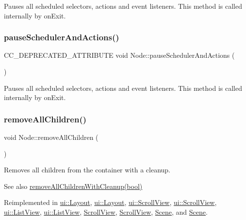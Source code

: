 Pauses all scheduled selectors, actions and event listeners. This method is called internally by on\+Exit. \mbox{\label{classNode_a7ff40b01310820986b26dd335ec19670}} 
\subsubsection{\texorpdfstring{pause\+Scheduler\+And\+Actions()}{pauseSchedulerAndActions()}\hspace{0.1cm}{\footnotesize\ttfamily [2/2]}}
{\footnotesize\ttfamily C\+C\+\_\+\+D\+E\+P\+R\+E\+C\+A\+T\+E\+D\+\_\+\+A\+T\+T\+R\+I\+B\+U\+TE void Node\+::pause\+Scheduler\+And\+Actions (\begin{DoxyParamCaption}{ }\end{DoxyParamCaption})}

Pauses all scheduled selectors, actions and event listeners. This method is called internally by on\+Exit. \mbox{\label{classNode_a0f6ef5518d2e5dd5be405e98b37ace4a}} 
\subsubsection{\texorpdfstring{remove\+All\+Children()}{removeAllChildren()}\hspace{0.1cm}{\footnotesize\ttfamily [1/2]}}
{\footnotesize\ttfamily void Node\+::remove\+All\+Children (\begin{DoxyParamCaption}{ }\end{DoxyParamCaption})\hspace{0.3cm}{\ttfamily [virtual]}}

Removes all children from the container with a cleanup.

\begin{DoxySeeAlso}{See also}
{\ttfamily \hyperlink{classNode_aca66e2b385c3dbf1a6f55627c4a13192}{remove\+All\+Children\+With\+Cleanup(bool)}} 
\end{DoxySeeAlso}


Reimplemented in \hyperlink{classui_1_1Layout_ace8bad280eb1b1df51211cca73131530}{ui\+::\+Layout}, \hyperlink{classui_1_1Layout_a6b40fa4ad7a14a1eece297e466e2c86e}{ui\+::\+Layout}, \hyperlink{classui_1_1ScrollView_aa036ed1712c78c6ee701eb94eea55091}{ui\+::\+Scroll\+View}, \hyperlink{classui_1_1ScrollView_aaef2d3ce7b1b7d485af4a3657bea17e5}{ui\+::\+Scroll\+View}, \hyperlink{classui_1_1ListView_acfa88e95692c1e9713697fbd2754379b}{ui\+::\+List\+View}, \hyperlink{classui_1_1ListView_a7e534825fe60406ed544a254b0975489}{ui\+::\+List\+View}, \hyperlink{classScrollView_a6a3b9ea8f88bca7ad741b511de369f24}{Scroll\+View}, \hyperlink{classScrollView_aaef2d3ce7b1b7d485af4a3657bea17e5}{Scroll\+View}, \hyperlink{classScene_af55bdd0731d6ccfdd1c95c4011451adb}{Scene}, and \hyperlink{classScene_a7e54f25b14b057ab896b0ef3262cef86}{Scene}.

